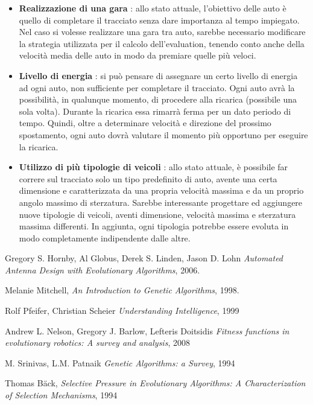 \documentclass[a4paper,12pt]{article}
\begin{document}
\begin{itemize}
	\item \textbf{Realizzazione di una gara} : allo stato attuale, l'obiettivo delle auto è quello di completare il tracciato senza dare importanza al tempo impiegato. Nel caso si volesse realizzare una gara tra auto, sarebbe necessario modificare la strategia utilizzata per il calcolo dell'evaluation, tenendo conto anche della velocità media delle auto in modo da premiare quelle più veloci.
	\item \textbf{Livello di energia} : si può pensare di assegnare un certo livello di energia ad ogni auto, non sufficiente per completare il tracciato. Ogni auto avrà la possibilità, in qualunque momento, di procedere alla ricarica (possibile una sola volta). Durante la ricarica essa rimarrà ferma per un dato periodo di tempo. Quindi, oltre a determinare velocità e direzione del prossimo spostamento, ogni auto dovrà valutare il momento più opportuno per eseguire la ricarica.
	\item \textbf{Utilizzo di più tipologie di veicoli} : allo stato attuale, è possibile far correre sul tracciato solo un tipo predefinito di auto, avente una certa dimensione e caratterizzata da una propria velocità massima e da un proprio angolo massimo di sterzatura. Sarebbe interessante progettare ed aggiungere nuove tipologie di veicoli, aventi dimensione, velocità massima e sterzatura massima differenti. In aggiunta, ogni tipologia potrebbe essere evoluta in modo completamente indipendente dalle altre. 
\end{itemize}

\newpage
\begin{thebibliography}{1}
	 Gregory S. Hornby, Al Globus, Derek S. Linden, Jason D. Lohn \emph{Automated Antenna Design with Evolutionary Algorithms}, 2006.
	
	 Melanie Mitchell, \emph{An Introduction to Genetic Algorithms}, 1998.
	
	 Rolf Pfeifer, Christian Scheier \emph{Understanding Intelligence}, 1999
	
	 Andrew L. Nelson, Gregory J. Barlow, Lefteris Doitsidis \emph{Fitness functions in evolutionary robotics: A survey and analysis}, 2008
	
	 M. Srinivas, L.M. Patnaik \emph{Genetic Algorithms: a Survey}, 1994
	
	 Thomas B\"{a}ck, \emph{Selective Pressure in Evolutionary Algorithms: A Characterization of Selection Mechanisms}, 1994
	
	
	
\end{thebibliography}
\end{document}

